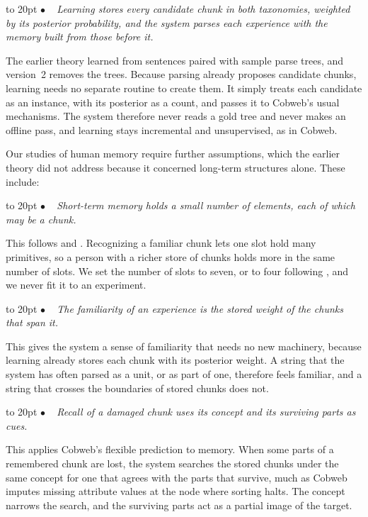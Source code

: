 \documentclass[11pt,letterpaper]{article}
\def\texitem#1{\par\noindent\hangindent 20pt\hbox to 20pt {\hss #1 ~}\ignorespaces}
\def\bull{\texitem{$\bullet$}}
\begin{document}
\vskip 0.05in

\bull
{\it Learning stores every candidate chunk in both taxonomies, weighted by its posterior
probability, and the system parses each experience with the memory built from those
before it.\/}

\vskip 0.02in
\noindent
The earlier theory learned from sentences paired with sample parse trees, and version~2
removes the trees. Because parsing already proposes candidate chunks, learning needs no
separate routine to create them. It simply treats each candidate as an instance, with
its posterior as a count, and passes it to Cobweb's usual mechanisms. The system
therefore never reads a gold tree and never makes an offline pass, and learning stays
incremental and unsupervised, as in Cobweb.

Our studies of human memory require further assumptions, which the earlier theory did
not address because it concerned long-term structures alone. These include:

\vskip 0.05in

\bull
{\it Short-term memory holds a small number of elements, each of which may be a chunk.\/}

\vskip 0.02in
\noindent
This follows \citet{miller-magical-seven} and \citet{chase-simon}. Recognizing a
familiar chunk lets one slot hold many primitives, so a person with a richer store of
chunks holds more in the same number of slots. We set the number of slots to seven, or
to four following \citet{cowan-magical-four}, and we never fit it to an experiment.

\vskip 0.05in

\bull
{\it The familiarity of an experience is the stored weight of the chunks that span it.\/}

\vskip 0.02in
\noindent
This gives the system a sense of familiarity that needs no new machinery, because
learning already stores each chunk with its posterior weight. A string that the system
has often parsed as a unit, or as part of one, therefore feels familiar, and a string
that crosses the boundaries of stored chunks does not.

\vskip 0.05in

\bull
{\it Recall of a damaged chunk uses its concept and its surviving parts as cues.\/}

\vskip 0.02in
\noindent
This applies Cobweb's flexible prediction to memory. When some parts of a remembered
chunk are lost, the system searches the stored chunks under the same concept for one
that agrees with the parts that survive, much as Cobweb imputes missing attribute values
at the node where sorting halts. The concept narrows the search, and the surviving
parts act as a partial image of the target.
\end{document}
